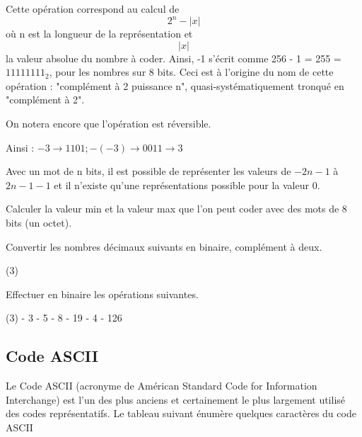 \documentclass[a4paper,11pt]{book}
\theoremstyle{definition}
\begin{document}
Cette opération correspond au calcul de \[ 2^n - |x| \] où n est la longueur de la représentation et \[ |x| \] la valeur absolue du nombre à coder. 
Ainsi, -1 s'écrit comme 256 - 1 = 255 = $1111 1111_{2}$, pour les nombres sur 8 bits. Ceci est à l'origine du nom de cette opération : "complément à 2 puissance n", quasi-systématiquement tronqué en "complément à 2".

On notera encore que l'opération est réversible. 

Ainsi :
$-3 \rightarrow 1101; -(-3) \rightarrow 0011 \rightarrow 3$


Avec un mot de n bits, il est possible de représenter les valeurs de $-2n-1$ à $2n-1-1$ et il n'existe qu'une représentations possible pour la valeur 0.

\begin{exercise}
    Calculer la valeur min et la valeur max que l'on peut coder avec des mots de 8 bits (un octet).
\end{exercise}

\begin{exercise}
    Convertir les nombres décimaux suivants en binaire, complément à deux.
    \begin{tasks}(3)
    \end{tasks}
\end{exercise}

\begin{exercise}
    Effectuer en binaire les opérations suivantes.
    \begin{tasks}(3)
         - 3
         - 5
         - 8
         - 19
         - 4
         - 126
    \end{tasks}
\end{exercise}

\subsection{Code ASCII}
Le Code ASCII (acronyme de Américan Standard Code for Information Interchange) est l’un des plus anciens et certainement le plus largement utilisé des codes représentatifs. Le tableau suivant énumère quelques caractères du code ASCII
\end{document}
